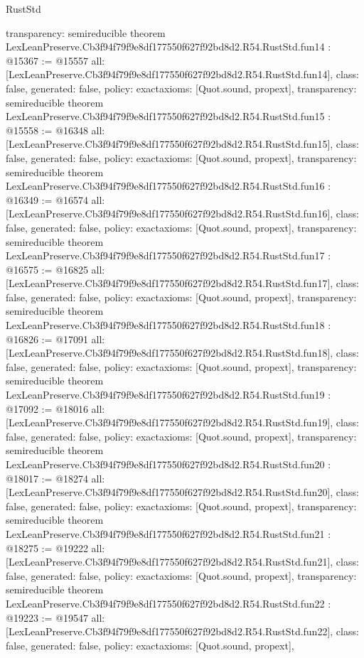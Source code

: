 \begin{lexlean}{RustStd}
\begin{coremodule}
{  transparency: semireducible
}
theorem LexLeanPreserve.Cb3f94f79f9e8df177550f627f92bd8d2.R54.RustStd.fun14 : @15367 := @15557 {
  all: [LexLeanPreserve.Cb3f94f79f9e8df177550f627f92bd8d2.R54.RustStd.fun14],
  class: false,
  generated: false,
  policy: exact{axioms: [Quot.sound, propext]},
  transparency: semireducible
}
theorem LexLeanPreserve.Cb3f94f79f9e8df177550f627f92bd8d2.R54.RustStd.fun15 : @15558 := @16348 {
  all: [LexLeanPreserve.Cb3f94f79f9e8df177550f627f92bd8d2.R54.RustStd.fun15],
  class: false,
  generated: false,
  policy: exact{axioms: [Quot.sound, propext]},
  transparency: semireducible
}
theorem LexLeanPreserve.Cb3f94f79f9e8df177550f627f92bd8d2.R54.RustStd.fun16 : @16349 := @16574 {
  all: [LexLeanPreserve.Cb3f94f79f9e8df177550f627f92bd8d2.R54.RustStd.fun16],
  class: false,
  generated: false,
  policy: exact{axioms: [Quot.sound, propext]},
  transparency: semireducible
}
theorem LexLeanPreserve.Cb3f94f79f9e8df177550f627f92bd8d2.R54.RustStd.fun17 : @16575 := @16825 {
  all: [LexLeanPreserve.Cb3f94f79f9e8df177550f627f92bd8d2.R54.RustStd.fun17],
  class: false,
  generated: false,
  policy: exact{axioms: [Quot.sound, propext]},
  transparency: semireducible
}
theorem LexLeanPreserve.Cb3f94f79f9e8df177550f627f92bd8d2.R54.RustStd.fun18 : @16826 := @17091 {
  all: [LexLeanPreserve.Cb3f94f79f9e8df177550f627f92bd8d2.R54.RustStd.fun18],
  class: false,
  generated: false,
  policy: exact{axioms: [Quot.sound, propext]},
  transparency: semireducible
}
theorem LexLeanPreserve.Cb3f94f79f9e8df177550f627f92bd8d2.R54.RustStd.fun19 : @17092 := @18016 {
  all: [LexLeanPreserve.Cb3f94f79f9e8df177550f627f92bd8d2.R54.RustStd.fun19],
  class: false,
  generated: false,
  policy: exact{axioms: [Quot.sound, propext]},
  transparency: semireducible
}
theorem LexLeanPreserve.Cb3f94f79f9e8df177550f627f92bd8d2.R54.RustStd.fun20 : @18017 := @18274 {
  all: [LexLeanPreserve.Cb3f94f79f9e8df177550f627f92bd8d2.R54.RustStd.fun20],
  class: false,
  generated: false,
  policy: exact{axioms: [Quot.sound, propext]},
  transparency: semireducible
}
theorem LexLeanPreserve.Cb3f94f79f9e8df177550f627f92bd8d2.R54.RustStd.fun21 : @18275 := @19222 {
  all: [LexLeanPreserve.Cb3f94f79f9e8df177550f627f92bd8d2.R54.RustStd.fun21],
  class: false,
  generated: false,
  policy: exact{axioms: [Quot.sound, propext]},
  transparency: semireducible
}
theorem LexLeanPreserve.Cb3f94f79f9e8df177550f627f92bd8d2.R54.RustStd.fun22 : @19223 := @19547 {
  all: [LexLeanPreserve.Cb3f94f79f9e8df177550f627f92bd8d2.R54.RustStd.fun22],
  class: false,
  generated: false,
  policy: exact{axioms: [Quot.sound, propext]},
}
\end{coremodule}
\end{lexlean}
